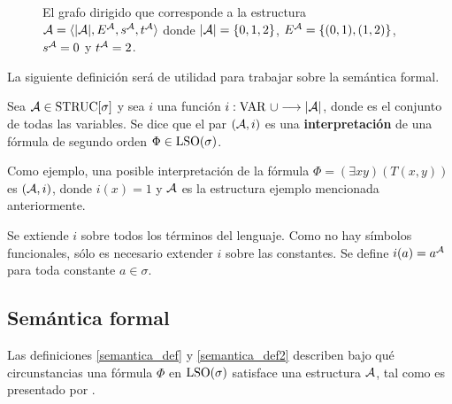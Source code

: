 \begin{figure}[h]
\begin{center}
\end{center}
\caption[Grafo dirigido correspondiente a una estructura \A]{El grafo dirigido que corresponde a la estructura $\mathcal{A}=\langle |\mathcal{A}|,E^{\mathcal{A}},s^{\mathcal{A}},t^{\mathcal{A}} \rangle$
donde $|\mathcal{A}|=\{0,1,2\}$, $E^{\mathcal{A}}=\{(0,1),(1,2)\}$, $s^{\mathcal{A}}=0$ y $t^{\mathcal{A}}=2$.}
\label{grafo_simple}
\end{figure}

La siguiente definición será de utilidad para trabajar sobre la semántica
formal.
\begin{definition}
Sea $\mathcal{A} \in \text{STRUC}[\sigma]$ y sea $i$ una función 
$i : \text{VAR}\ \cup \longrightarrow |\mathcal{A}|$, donde  es el conjunto de
todas las variables.
Se dice que el par $(\mathcal{A}, i)$ es una \textbf{interpretación} de una fórmula de
segundo orden $\Phi \in \text{LSO}(\sigma)$.
\end{definition}
Como ejemplo, una posible interpretación de la fórmula $\Phi =
(\exists xy) (T(x, y))$
es $(\mathcal{A}, i)$, donde $i(x) = 1$ y $\mathcal{A}$ es la estructura ejemplo mencionada
anteriormente.
\begin{definition}
Se extiende $i$ sobre todos los términos del lenguaje. Como no hay símbolos
funcionales, sólo es necesario extender $i$ sobre las constantes. Se define
$i(a) = a^{\mathcal{A}}$ para toda constante $a \in \sigma$.
\end{definition}

\subsection{Semántica formal}
Las definiciones \ref{semantica_def} y \ref{semantica_def2} describen 
bajo qué circunstancias una fórmula $\Phi$ en
$\text{LSO}(\sigma)$ satisface una estructura $\mathcal{A}$, tal como es
presentado por \cite{immerman:book}.

